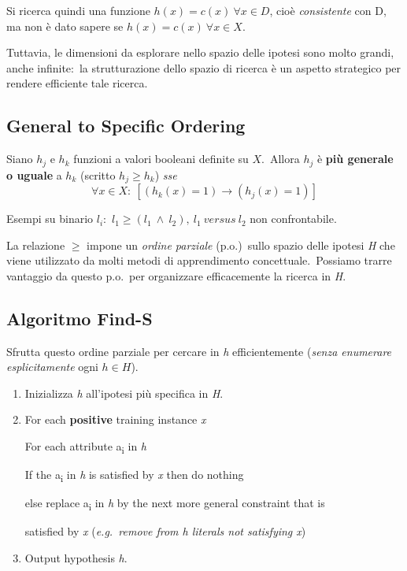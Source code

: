 \vspace{12pt}

\noindent Si ricerca quindi una funzione $h(x)=c(x)\ \forall x \in D$, cioè \textit{consistente} con D, ma non è dato sapere se $h(x)=c(x)\ \forall x \in X$.\

Tuttavia, le dimensioni da esplorare nello spazio delle ipotesi sono molto grandi, anche infinite:\ la strutturazione dello spazio di ricerca è un aspetto strategico per rendere efficiente tale ricerca.\

\subsection{General to Specific Ordering}

\begin{definition}

	Siano $h_j$ e $h_k$ funzioni a valori booleani definite su $X$.\
	Allora $h_j$ è \textbf{più generale o uguale} a $h_k$ (scritto $h_j \geq h_k$) \textit{sse}
	\[
		\forall x \in X:\ [\left(h_k(x)=1\right) \rightarrow \left(h_j(x)=1\right)]
	\]
\end{definition}

\noindent Esempi su binario $l_i$:\ $l_1 \geq (l_1\ \land\ l_2),\ l_1\ versus\ l_2$ non confrontabile.

La relazione $\geq$ impone un \textit{ordine parziale} (p.o.)\ sullo spazio delle ipotesi \textit{H} che viene utilizzato da molti metodi di apprendimento concettuale.\
Possiamo trarre vantaggio da questo p.o.\ per organizzare efficacemente la ricerca in \textit{H}.\

\subsection{Algoritmo Find-S}

Sfrutta questo ordine parziale per cercare in \textit{h} efficientemente (\textit{senza enumerare esplicitamente} ogni $h \in H$).\

\begin{enumerate}
	\item Inizializza \textit{h} all'ipotesi più specifica in \textit{H}.
	\item
	      \begin{flushleft}
		      For each \textbf{positive} training instance \textit{x}

		      \quad For each attribute a\textsubscript{i} in \textit{h}

		      \qquad If the a\textsubscript{i} in \textit{h} is satisfied by \textit{x} then do nothing

		      \qquad else replace a\textsubscript{i} in \textit{h} by the next more general constraint that is

		      \qquad\quad satisfied by \textit{x} (\textit{e.g.\ remove from h literals not satisfying x})
	      \end{flushleft}

	\item Output hypothesis \textit{h}.
\end{enumerate}

